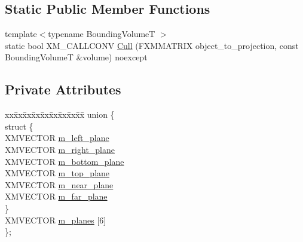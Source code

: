 \subsection*{Static Public Member Functions}
\begin{DoxyCompactItemize}
\item 
{\footnotesize template$<$typename Bounding\+VolumeT $>$ }\\static bool X\+M\+\_\+\+C\+A\+L\+L\+C\+O\+NV \mbox{\hyperlink{classmage_1_1_bounding_frustum_af2080fda86e99ae8dda866b7a90f84a1}{Cull}} (F\+X\+M\+M\+A\+T\+R\+IX object\+\_\+to\+\_\+projection, const Bounding\+VolumeT \&volume) noexcept
\end{DoxyCompactItemize}
\subsection*{Private Attributes}
\begin{DoxyCompactItemize}
\item 
\begin{tabbing}
xx\=xx\=xx\=xx\=xx\=xx\=xx\=xx\=xx\=\kill
union \{\\
\>struct \{\\
\>\>XMVECTOR \mbox{\hyperlink{classmage_1_1_bounding_frustum_ae9ce2430295e49fe9dff4940fa9aafb1}{m\_left\_plane}}\\
\>\>XMVECTOR \mbox{\hyperlink{classmage_1_1_bounding_frustum_a28a9d13ade71eb4253e452e6c53c31fe}{m\_right\_plane}}\\
\>\>XMVECTOR \mbox{\hyperlink{classmage_1_1_bounding_frustum_ae416db4ef5c2fc3eb2e2f25f6e45e747}{m\_bottom\_plane}}\\
\>\>XMVECTOR \mbox{\hyperlink{classmage_1_1_bounding_frustum_acea4c43991bf09de647f7ee70feb1fff}{m\_top\_plane}}\\
\>\>XMVECTOR \mbox{\hyperlink{classmage_1_1_bounding_frustum_abd4fa19a2fa0e88342ab4bc2726bf885}{m\_near\_plane}}\\
\>\>XMVECTOR \mbox{\hyperlink{classmage_1_1_bounding_frustum_a8a1841dcd6c7fdbecbd1dd5c39558e8e}{m\_far\_plane}}\\
\>\} \\
\>XMVECTOR \mbox{\hyperlink{classmage_1_1_bounding_frustum_a077e9ac802e5272dd9cf60a57546505c}{m\_planes}} \mbox{[}6\mbox{]}\\
\}; \\

\end{tabbing}\end{DoxyCompactItemize}


